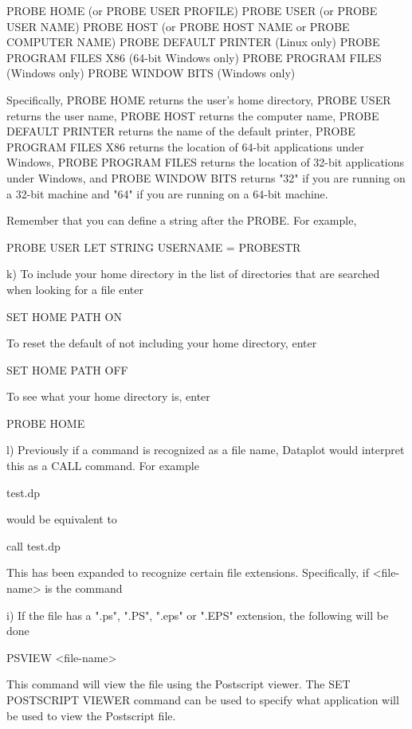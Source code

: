            PROBE HOME  (or PROBE USER PROFILE)
           PROBE USER  (or PROBE USER NAME)
           PROBE HOST  (or PROBE HOST NAME or PROBE COMPUTER NAME)
           PROBE DEFAULT PRINTER (Linux only)
           PROBE PROGRAM FILES X86 (64-bit Windows only)
           PROBE PROGRAM FILES     (Windows only)
           PROBE WINDOW BITS       (Windows only)

      Specifically, PROBE HOME returns the user's home directory,
      PROBE USER returns the user name, PROBE HOST returns the computer
      name, PROBE DEFAULT PRINTER returns the name of the default
      printer, PROBE PROGRAM FILES X86 returns the location of
      64-bit applications under Windows, PROBE PROGRAM FILES returns
      the location of 32-bit applications under Windows, and
      PROBE WINDOW BITS returns "32" if you are running on a
      32-bit machine and "64" if you are running on a 64-bit
      machine.

      Remember that you can define a string after the PROBE.  For
      example,

          PROBE USER
          LET STRING USERNAME = PROBESTR

    k) To include your home directory in the list of directories that
       are searched when looking for a file enter

          SET HOME PATH ON

       To reset the default of not including your home directory, enter

          SET HOME PATH OFF

       To see what your home directory is, enter

          PROBE HOME

    l) Previously if a command is recognized as a file name, Dataplot
       would interpret this as a CALL command.  For example

           test.dp

       would be equivalent to

           call test.dp

       This has been expanded to recognize certain file extensions.
       Specifically, if <file-name> is the command

           i) If the file has a ".ps", ".PS", ".eps" or ".EPS" extension,
              the following will be done

                  PSVIEW  <file-name>

              This command will view the file using the Postscript
              viewer.  The SET POSTSCRIPT VIEWER command can be used to
              specify what application will be used to view the
              Postscript file.

